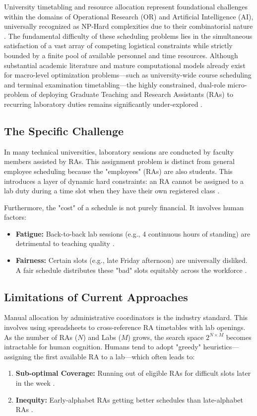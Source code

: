 \documentclass[journal,onecolumn]{IEEEtran}
\begin{document}
University timetabling and resource allocation represent foundational challenges within the domains of Operational Research (OR) and Artificial Intelligence (AI), universally recognized as NP-Hard complexities due to their combinatorial nature \cite{burke2004state}. The fundamental difficulty of these scheduling problems lies in the simultaneous satisfaction of a vast array of competing logistical constraints while strictly bounded by a finite pool of available personnel and time resources. Although substantial academic literature and mature computational models already exist for macro-level optimization problems—such as university-wide course scheduling and terminal examination timetabling—the highly constrained, dual-role micro-problem of deploying Graduate Teaching and Research Assistants (RAs) to recurring laboratory duties remains significantly under-explored \cite{pinedo, edu_or}.

\subsection{The Specific Challenge}
In many technical universities, laboratory sessions are conducted by faculty members assisted by RAs. This assignment problem is distinct from general employee scheduling because the "employees" (RAs) are also students. This introduces a layer of dynamic hard constraints: an RA cannot be assigned to a lab duty during a time slot when they have their own registered class \cite{pinedo, staff_scheduling}.

Furthermore, the "cost" of a schedule is not purely financial. It involves human factors:
\begin{itemize}
    \item \textbf{Fatigue:} Back-to-back lab sessions (e.g., 4 continuous hours of standing) are detrimental to teaching quality \cite{fatigue, anderson2018}.
    \item \textbf{Fairness:} Certain slots (e.g., late Friday afternoon) are universally disliked. A fair schedule distributes these "bad" slots equitably across the workforce \cite{fairness_ml, fair_allocation}.
\end{itemize}

\subsection{Limitations of Current Approaches}
Manual allocation by administrative coordinators is the industry standard. This involves using spreadsheets to cross-reference RA timetables with lab openings. As the number of RAs ($N$) and Labs ($M$) grows, the search space $2^{N \times M}$ becomes intractable for human cognition. Humans tend to adopt "greedy" heuristics—assigning the first available RA to a lab—which often leads to:
\begin{enumerate}
    \item \textbf{Sub-optimal Coverage:} Running out of eligible RAs for difficult slots later in the week \cite{staff_scheduling}.
    \item \textbf{Inequity:} Early-alphabet RAs getting better schedules than late-alphabet RAs \cite{fair_allocation}.
\end{enumerate}
\end{document}
